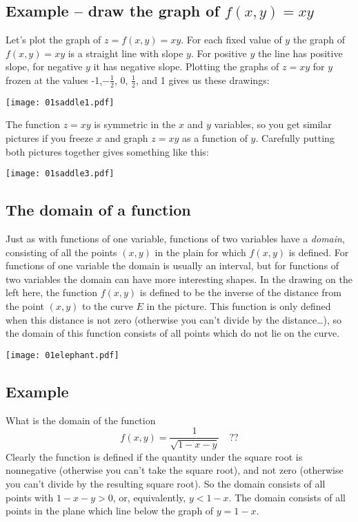\subsection{Example -- draw the graph of $f(x,y) = xy$} %
\label{sec:example-of-a-function3}
Let's plot the graph of $ z=f(x,y)=xy $.  For each fixed value of $ y $
the graph of $ f(x,y)=xy $ is a straight line with slope $ y $.  For
positive $ y $ the line has positive slope, for negative $ y $ it has
negative slope.   Plotting the graphs of $ z=xy $ for $ y $ frozen at
the values -1,$ -\frac{1}{2} $, $ 0 $, $ \frac{1}{2} $, and 1 gives us
these drawings:

\centerline{\texttt{[image: 01saddle1.pdf]}}


The function $ z=xy $ is symmetric in the $ x $ and $ y $ variables,
so you get similar pictures if you freeze $ x $ and graph $ z=xy $ as
a function of $ y $.  Carefully putting both pictures together gives
something like this:

\centerline{\texttt{[image: 01saddle3.pdf]}}



\subsection{The domain of a function} %

\begin{multicols}{2}

Just as with functions of one variable, functions of two variables
have a \emph{domain}, consisting of all the points $(x, y)$ in the
plain for which $f(x,y)$ is defined.  For functions of one variable
the domain is usually an interval, but for functions of two
variables the domain can have more interesting shapes.  In the
drawing on the left here, the function $f(x,y)$ is defined to be the
inverse of the distance from the point $(x, y)$ to the curve $E$ in
the picture.  This function is only defined when this distance is
not zero (otherwise you can't divide by the distance\ldots), so the
domain of this function consists of all points which do not lie on
the curve.

\centerline{\texttt{[image: 01elephant.pdf]}}
\end{multicols}
\subsection{Example}  What is the domain of the function %
\[
f(x, y) = \frac{1}{\sqrt{1-x-y}}\quad??
\]
Clearly the function is defined if the quantity under the square root
is nonnegative (otherwise you can't take the square root), and not
zero (otherwise you can't divide by the resulting square root).  So
the domain consists of all points with $1-x-y>0$, or, equivalently,
$y<1-x$.  The domain consists of all points in the plane which line
below the graph of $y=1-x$.



